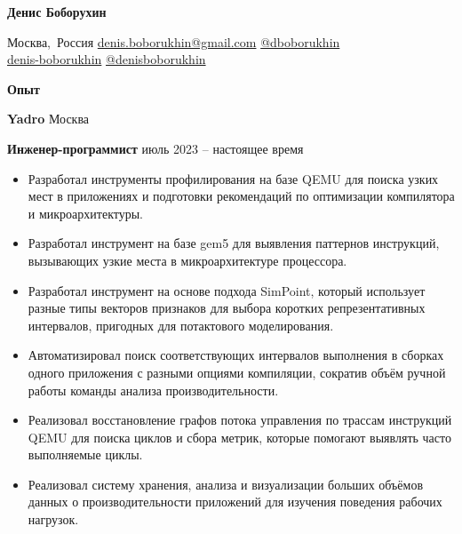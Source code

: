 \documentclass[11pt]{article}
\begin{document}
\begin{center}
  \textbf{Денис Боборухин}\\
  \hrulefill
\end{center}

\newcommand{\infofield}[2]{\mbox{{\normalsize #1}\hspace{0.5em}#2}}
\newcommand{\email}[1]{\infofield{\faEnvelope}{\href{mailto:#1}{#1}}}
\newcommand{\location}[1]{\infofield{\faMapMarker}{#1}}
\newcommand{\linkedin}[2]{\infofield{\faLinkedin}{\href{#2}{#1}}}
\newcommand{\github}[2]{\infofield{\faGithub}{\href{#2}{#1}}}
\newcommand{\telegram}[2]{\infofield{\faSend}{\href{#2}{#1}}}

\begin{center}
  \location{Москва, Россия}
  \email{denis.boborukhin@gmail.com}
  \telegram{@dboborukhin}{https://t.me/dboborukhin} \\
  \linkedin{denis-boborukhin}{https://www.linkedin.com/in/denis-boborukhin}
  \github{@denisboborukhin}{https://github.com/denisboborukhin}
\end{center}

\vspace{0.5pt}

\begin{center}
  \textbf{Опыт}
\end{center}
\textbf{Yadro} \hfill Москва

\textbf{Инженер-программист} \hfill июль 2023 – настоящее время
\begin{itemize}[noitemsep, topsep=0pt, partopsep=0pt, parsep=0pt]
  \item Разработал инструменты профилирования на базе QEMU для поиска узких мест в приложениях
    и подготовки рекомендаций по оптимизации компилятора и микроархитектуры.
  \item Разработал инструмент на базе gem5 для выявления паттернов инструкций, вызывающих узкие места
    в микроархитектуре процессора.
  \item Разработал инструмент на основе подхода SimPoint, который использует разные типы векторов признаков
    для выбора коротких репрезентативных интервалов, пригодных для потактового моделирования.
  \item Автоматизировал поиск соответствующих интервалов выполнения в сборках одного приложения
    с разными опциями компиляции, сократив объём ручной работы команды анализа производительности.
  \item Реализовал восстановление графов потока управления по трассам инструкций QEMU для поиска
    циклов и сбора метрик, которые помогают выявлять часто выполняемые циклы.
  \item Реализовал систему хранения, анализа и визуализации больших объёмов данных
    о производительности приложений для изучения поведения рабочих нагрузок.
\end{itemize}
\end{document}
